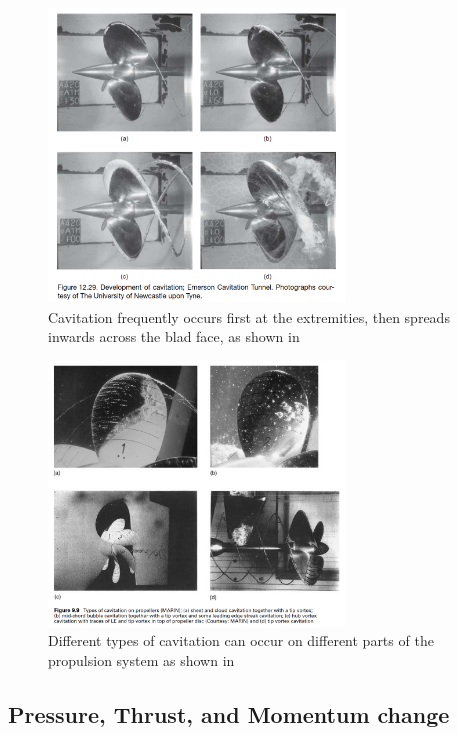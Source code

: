 \documentclass{article}\usepackage[]{graphicx}\usepackage[]{color}
\begin{document}
\begin{figure}
\includegraphics[width=0.7\textwidth]{IncreasingCavitation.png}
\caption{Cavitation frequently occurs first at the extremities, then spreads inwards across the blad face, as shown in \parencite{mollard2011}}
\label{fig:IncreasingCavitation.png}
\end{figure}


\begin{figure}
\includegraphics[width=0.7\textwidth]{CavitationTypes.png}
\caption{Different types of cavitation can occur on different parts of the propulsion system as shown in \parencite{carlton2007}}
\label{fig:CavitationTypes.png}
\end{figure}

\subsection{Pressure, Thrust, and Momentum change}
\end{document}
